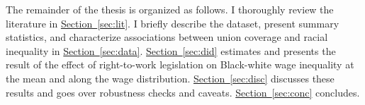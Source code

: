 \documentclass[11pt]{article}
\begin{document}
The remainder of the thesis is organized as follows. I thoroughly review the literature in \hyperref[sec:lit]{Section~\ref*{sec:lit}}. I briefly describe the dataset, present summary statistics, and characterize associations between union coverage and racial inequality in \hyperref[sec:data]{Section~\ref*{sec:data}}. \hyperref[sec:did]{Section~\ref*{sec:did}} estimates and presents the result of the effect of right-to-work legislation on Black-white wage inequality at the mean and along the wage distribution. \hyperref[sec:disc]{Section~\ref*{sec:disc}} discusses these results and goes over robustness checks and caveats. \hyperref[sec:conc]{Section~\ref*{sec:conc}} concludes.

\end{document}
